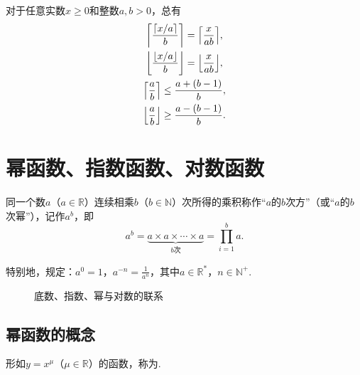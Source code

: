\begin{property}
对于任意实数\(x \geq 0\)和整数\(a,b>0\)，总有\begin{gather}
\ceil*{\frac{\ceil{x/a}}{b}} = \ceil*{\frac{x}{ab}}, \\
\floor*{\frac{\floor{x/a}}{b}} = \floor*{\frac{x}{ab}}, \\
\ceil*{\frac{a}{b}} \leq \frac{a+(b-1)}{b}, \\
\floor*{\frac{a}{b}} \geq \frac{a-(b-1)}{b}.
\end{gather}
\end{property}

\section{幂函数、指数函数、对数函数}
\begin{definition}
同一个数\(a\)（\(a\in\mathbb{R}\)）连续相乘\(b\)（\(b\in\mathbb{N}\)）次所得的乘积称作“\(a\)的\(b\)次方”（或“\(a\)的\(b\)次幂”），记作\(a^b\)，即\[
a^b = \underbrace{a \times a \times \dotsm \times a}_{b\text{次}} = \prod\limits_{i=1}^b a.
\]

特别地，规定：\(a^0 = 1\)，\(a^{-n} = \frac{1}{a^n}\)，其中\(a\in\mathbb{R}^*\)，\(n\in\mathbb{N}^+\).
\end{definition}

\begin{figure}[ht]
\centering
{}
\caption{底数、指数、幂与对数的联系}
\label{figure:函数.底数、指数、幂与对数的联系}
\end{figure}

\subsection{幂函数的概念}
\begin{definition}[幂函数]
形如\(y=x^{\mu}\)（\(\mu \in \mathbb{R}\)）的函数，称为.
\end{definition}

